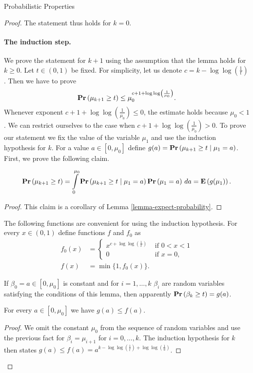 \begin{section}{Probabilistic Properties}
\begin{proof}
The statement thus holds for $k = 0$.

\paragraph*{The induction step.} We prove the statement for $k + 1$ using the assumption that the lemma holds for $k \geq 0$. Let $t \in (0, 1)$ be fixed. For simplicity, let us denote $c = k - \log \log \left(\frac{1}{t}\right)$. Then we have to prove
\[
	\mathbf{Pr}\left(\mu_{k + 1} \geq t\right) \leq \mu_0 ^ {c + 1 + \log \log \left(\frac{1}{\mu_0}\right)} \text{.}
\]
Whenever exponent $c + 1 + \log \log \left(\frac{1}{\mu_0}\right) \leq 0$, the estimate holds because $\mu_0 < 1$. We can restrict ourselves to the case when $c + 1 + \log \log \left(\frac{1}{\mu_0}\right) > 0$. To prove our statement we fix the value of the variable $\mu_1$ and use the induction hypothesis for $k$. For a value $a \in \left[0, \mu_0\right]$ define $g(a) = \mathbf{Pr}\left(\mu_{k + 1} \geq t \mid \mu_1 = a\right)$. First, we prove the following claim.
\begin{claim}
\label{claim-expected-value}
\[
	\mathbf{Pr}\left(\mu_{k + 1} \geq t\right) = \int\limits_{0}^{\mu_0}\mathbf{Pr}\left(\mu_{k + 1} \geq t \mid \mu_1 = a\right)\mathbf{Pr}\left(\mu_1 = a\right) \, da = \mathbf{E}\left(g(\mu_1)\right) \text{.}
\]
\end{claim}
\begin{proof}
This claim is a corollary of Lemma \ref{lemma-expect-probability}.
\end{proof}

The following functions are convenient for using the induction hypothesis. For every $x \in (0, 1)$ define functions $f$ and $f_0$ as
\[ 
\begin{split}
f_0(x) &= \begin{cases}
	x ^ {c + \log \log \left(\frac{1}{x}\right)} & \text{ if } 0 < x < 1 \\ 
	0 & \text{ if } x = 0 \text{,}
\end{cases} \\
f(x) & = \min \{1, f_0(x) \} \text{.} 
\end{split}
\]

If $\beta_0 = a \in \left[0, \mu_0 \right]$ is constant and for $i = 1, \dots, k$ $\beta_i$ are random variables satisfying the conditions of this lemma, then apparently $\mathbf{Pr}\left(\beta_k \geq t\right) = g(a)$. 

\begin{claim}
\label{claim-estimate-g}
For every $a \in \left[0, \mu_0 \right]$ we have $g(a) \leq f(a)$.
\end{claim}
\begin{proof}
We omit the constant $\mu_0$ from the sequence of random variables and use the previous fact for $\beta_{i} = \mu_{i + 1}$ for $i = 0, \dots, k$. The induction hypothesis for $k$ then states $g(a) \leq f(a) = a^{k - \log \log \left(\frac{1}{t}\right) + \log \log \left(\frac{1}{a}\right)}$. 
\end{proof}


\end{proof}
\end{section}
